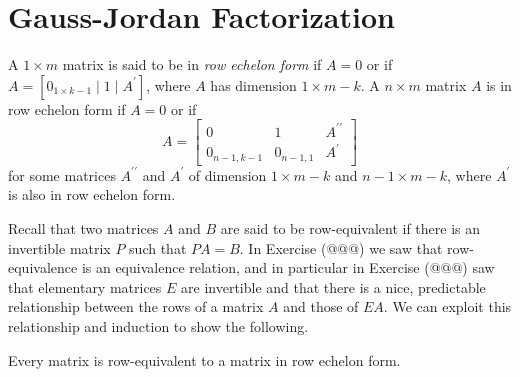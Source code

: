 \section{Gauss-Jordan Factorization}

\begin{dfn}
A $1 \times m$ matrix is said to be in \emph{row echelon form} if $A = 0$ or if $A = [0_{1 \times k-1} \mid 1 \mid A^\prime]$, where $A$ has dimension $1 \times m-k$. A $n \times m$ matrix $A$ is in row echelon form if $A = 0$ or if \[A = \left[\begin{array}{c|c|c} 0 & 1 & A^{\prime\prime} \\ \hline 0_{n-1,k-1} & 0_{n-1,1} & A^\prime \end{array}\right] \] for some matrices $A^{\prime\prime}$ and $A^\prime$ of dimension $1 \times m-k$ and $n-1 \times m-k$, where $A^\prime$ is also in row echelon form.
\end{dfn}

Recall that two matrices $A$ and $B$ are said to be row-equivalent if there is an invertible matrix $P$ such that $PA = B$. In Exercise (@@@) we saw that row-equivalence is an equivalence relation, and in particular in Exercise (@@@) saw that elementary matrices $E$ are invertible and that there is a nice, predictable relationship between the rows of a matrix $A$ and those of $EA$. We can exploit this relationship and induction to show the following.

\begin{prp}
Every matrix is row-equivalent to a matrix in row echelon form.
\end{prp}


